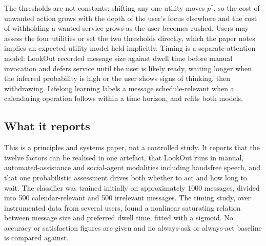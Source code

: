 \begin{center}
\end{center}

The thresholds are not constants: shifting any one utility moves $p^{*}$, so the cost of unwanted action grows with the depth of the user's focus elsewhere and the cost of withholding a wanted service grows as the user becomes rushed. Users may assess the four utilities or set the two thresholds directly, which the paper notes implies an expected-utility model held implicitly. Timing is a separate attention model: LookOut recorded message size against dwell time before manual invocation and defers service until the user is likely ready, waiting longer when the inferred probability is high or the user shows signs of thinking, then withdrawing. Lifelong learning labels a message schedule-relevant when a calendaring operation follows within a time horizon, and refits both models.

\subsection{What it reports}

This is a principles and systems paper, not a controlled study. It reports that the twelve factors can be realised in one artefact, that LookOut runs in manual, automated-assistance and social-agent modalities including handsfree speech, and that one probabilistic assessment drives both whether to act and how long to wait. The classifier was trained initially on approximately 1000 messages, divided into 500 calendar-relevant and 500 irrelevant messages. The timing study, over instrumented data from several users, found a nonlinear saturating relation between message size and preferred dwell time, fitted with a sigmoid. No accuracy or satisfaction figures are given and no always-ask or always-act baseline is compared against.


